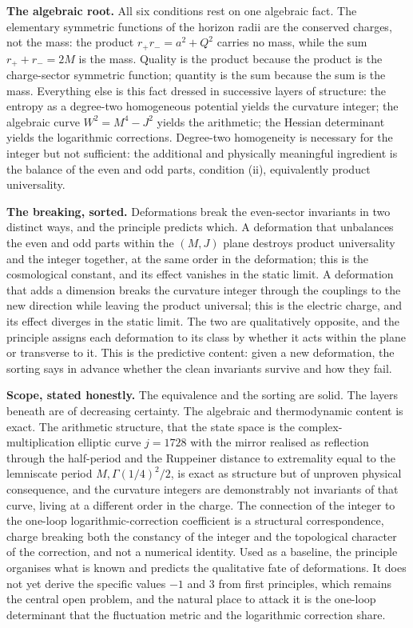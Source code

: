 \documentclass[11pt]{article}
\begin{document}
\textbf{The algebraic root.} All six conditions rest on one algebraic fact. The elementary symmetric functions of the horizon radii are the conserved charges, not the mass: the product $r_+r_- = a^2 + Q^2$ carries no mass, while the sum $r_+ + r_- = 2M$ is the mass. Quality is the product because the product is the charge-sector symmetric function; quantity is the sum because the sum is the mass. Everything else is this fact dressed in successive layers of structure: the entropy as a degree-two homogeneous potential yields the curvature integer; the algebraic curve $W^2 = M^4 - J^2$ yields the arithmetic; the Hessian determinant yields the logarithmic corrections. Degree-two homogeneity is necessary for the integer but not sufficient: the additional and physically meaningful ingredient is the balance of the even and odd parts, condition (ii), equivalently product universality.

\textbf{The breaking, sorted.} Deformations break the even-sector invariants in two distinct ways, and the principle predicts which. A deformation that unbalances the even and odd parts within the $(M,J)$ plane destroys product universality and the integer together, at the same order in the deformation; this is the cosmological constant, and its effect vanishes in the static limit. A deformation that adds a dimension breaks the curvature integer through the couplings to the new direction while leaving the product universal; this is the electric charge, and its effect diverges in the static limit. The two are qualitatively opposite, and the principle assigns each deformation to its class by whether it acts within the plane or transverse to it. This is the predictive content: given a new deformation, the sorting says in advance whether the clean invariants survive and how they fail.

\textbf{Scope, stated honestly.} The equivalence and the sorting are solid. The layers beneath are of decreasing certainty. The algebraic and thermodynamic content is exact. The arithmetic structure, that the state space is the complex-multiplication elliptic curve $j = 1728$ with the mirror realised as reflection through the half-period and the Ruppeiner distance to extremality equal to the lemniscate period $M,\Gamma(1/4)^2/2$, is exact as structure but of unproven physical consequence, and the curvature integers are demonstrably not invariants of that curve, living at a different order in the charge. The connection of the integer to the one-loop logarithmic-correction coefficient is a structural correspondence, charge breaking both the constancy of the integer and the topological character of the correction, and not a numerical identity. Used as a baseline, the principle organises what is known and predicts the qualitative fate of deformations. It does not yet derive the specific values $-1$ and $3$ from first principles, which remains the central open problem, and the natural place to attack it is the one-loop determinant that the fluctuation metric and the logarithmic correction share.
\end{document}
